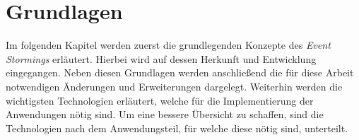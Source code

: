 \chapter{Grundlagen}\label{ch:technologien}
Im folgenden Kapitel werden zuerst die grundlegenden Konzepte des \textit{Event Stormings} erläutert.
Hierbei wird auf dessen Herkunft und Entwicklung eingegangen.
Neben diesen Grundlagen werden anschließend die für diese Arbeit notwendigen Änderungen und Erweiterungen dargelegt.
Weiterhin werden die wichtigsten Technologien erläutert, welche für die Implementierung der Anwendungen nötig sind.
Um eine bessere Übersicht zu schaffen, sind die Technologien nach dem Anwendungsteil, für welche diese nötig sind, unterteilt.




